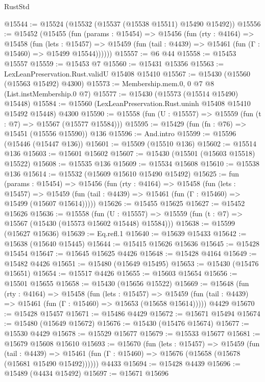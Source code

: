 \begin{lexlean}{RustStd}
\begin{coremodule}
@15544 := @15524 (@15532 (@15537 (@15538 @15511) @15490 @15492))
@15556 := @15452
    (@15455
      (fun (params : @15454) =>
      @15456
        (fun (rty : @4164) =>
        @15458
          (fun (lets : @15457) =>
          @15459 (fun (tail : @4439) => @15461 (fun (Γ : @15460) => @15499 @15544))))))
@15557 := @6 @44
@15558 := @15453 @15557
@15559 := @15453 @7
@15560 := @15431 @15356
@15563 := LexLeanPreservation.Rust.validU @15408 @15410
@15567 := @15430 (@15560 (@15563 @15492) @4300)
@15573 := Membership.mem.{0, 0} @7 @8 (List.instMembership.{0} @7)
@15577 := @15430 (@15573 (@15514 @15490) @15448)
@15584 := @15560 (LexLeanPreservation.Rust.uninh @15408 @15410 @15492 @15448) @4300
@15590 := @15558 (fun (U : @15557) => @15559 (fun (t : @7) => @15567 (@15577 @15584)))
@15595 := @15429 (fun (fn : @76) => @15451 (@15556 @15590)) @136
@15596 := And.intro
@15599 := @15596 (@15446 (@15447 @136))
@15601 := @15509 (@15510 @136)
@15602 := @15514 @136
@15603 := @15601 @15602
@15607 := @15430 (@15501 (@15603 @15518) @15522)
@15608 := @15535 @136
@15609 := @15534 @15608
@15610 := @15538 @136
@15614 := @15532 (@15609 @15610 @15490 @15492)
@15625 := fun (params : @15454) =>
  @15456
    (fun (rty : @4164) =>
    @15458
      (fun (lets : @15457) =>
      @15459 (fun (tail : @4439) => @15461 (fun (Γ : @15460) => @15499 (@15607 @15614)))))
@15626 := @15455 @15625
@15627 := @15452 @15626
@15636 := @15558
    (fun (U : @15557) => @15559 (fun (t : @7) => @15567 (@15430 (@15573 @15602 @15448) @15584)))
@15638 := @15599 (@15627 @15636)
@15639 := Eq.refl.{1}
@15640 := @15639 @15433
@15642 := @15638 (@15640 @15445)
@15644 := @15415 @15626 @15636
@15645 := @15428 @15454
@15647 := @15645 @15625 @4426
@15648 := @15428 @4164
@15649 := @15482 @4426
@15651 := @15480 (@15649 @15495)
@15653 := @15430 (@15476 @15651)
@15654 := @15517 @4426
@15655 := @15603 @15654
@15656 := @15501 @15655
@15658 := @15430 (@15656 @15522)
@15669 := @15648
    (fun (rty : @4164) =>
    @15458
      (fun (lets : @15457) =>
      @15459 (fun (tail : @4439) => @15461 (fun (Γ : @15460) => @15653 (@15658 @15614)))))
    @4429
@15670 := @15428 @15457
@15671 := @15486 @4429
@15672 := @15671 @15494
@15674 := @15480 (@15649 @15672)
@15676 := @15430 (@15476 @15674)
@15677 := @15530 @4429
@15678 := @15529 @15677
@15679 := @15533 @15677
@15681 := @15679 @15608 @15610
@15693 := @15670
    (fun (lets : @15457) =>
    @15459
      (fun (tail : @4439) =>
      @15461 (fun (Γ : @15460) => @15676 (@15658 (@15678 (@15681 @15490 @15492))))))
    @4433
@15694 := @15428 @4439
@15696 := @15489 (@4434 @15492)
@15697 := @15671 @15696

\end{coremodule}
\end{lexlean}

